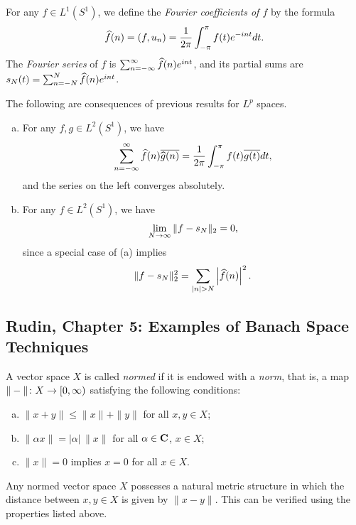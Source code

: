 \begin{definition}
  For any $f \in L^1(S^1)$, we define the \emph{Fourier coefficients of $f$} by the formula
  \[
  \widehat{f}(n) = (f, u_n) = \frac{1}{2\pi} \int_{-\pi}^{\pi} f(t) e^{-i n t} d t.
  \]
  The \emph{Fourier series} of $f$ is $\sum_{n=-\infty}^{\infty} \widehat{f}(n) e^{i n t}$, and its partial sums are $s_N(t) = \sum_{n=-N}^N \widehat{f}(n) e^{i n t}$.
\end{definition}

The following are consequences of previous results for $L^p$ spaces.

\begin{corollary}
  \mbox{}
  \begin{enumerate}[(a)]
  \item For any $f,g \in L^2(S^1)$, we have
    \[
    \sum_{n = -\infty}^\infty \widehat{f}(n) \overline{\widehat{g}(n)} = \frac{1}{2\pi} \int_{-\pi}^{\pi} f(t)\overline{g(t)} d t,
    \]
    and the series on the left converges absolutely.
  \item For any $f \in L^2(S^1)$, we have
    \[
    \lim_{N \rightarrow \infty} \|f-s_N\|_2 = 0,
    \]
    since a special case of (a) implies
\[
\|f-s_N\|^2_2 = \sum_{|n| > N} \left| \widehat{f}(n) \right|^2.
\]
  \end{enumerate}
\end{corollary}

\subsection{Rudin, Chapter 5: Examples of Banach Space Techniques}

\begin{definition}
  A vector space $X$ is called \emph{normed} if it is endowed with a \emph{norm}, that is, a map $\|-\| \colon X \rightarrow [0,\infty)$ satisfying the following conditions:
  \begin{enumerate}[(a)]
  \item $\|x+y\| \leq \|x\| + \|y\|$ for all $x,y \in X$;
  \item $\|\alpha x\| = |\alpha| \, \|x\|$ for all $\alpha \in \mathbf{C}$, $x \in X$;
  \item $\|x\| = 0$ implies $x = 0$ for all $x \in X$.
  \end{enumerate}
\end{definition}

\begin{remark}
  Any normed vector space $X$ possesses a natural metric structure in which the distance between $x,y \in X$ is given by $\|x-y\|$. This can be verified using the properties listed above.
\end{remark}


